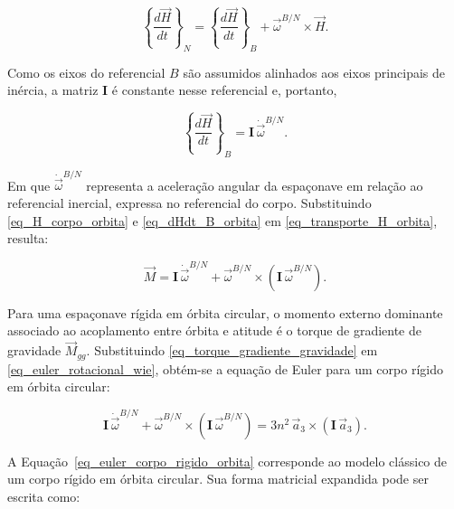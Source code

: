 \begin{equation}
\left\{ \frac{d\vec{H}}{dt} \right\}_{N}
=
\left\{ \frac{d\vec{H}}{dt} \right\}_{B}
+
\vec{\omega}^{B/N}\times\vec{H}.
\label{eq_transporte_H_orbita}
\end{equation}

Como os eixos do referencial $B$ são assumidos alinhados aos eixos principais de inércia, a matriz $\mathbf{I}$ é constante nesse referencial e, portanto,

\begin{equation}
\left\{ \frac{d\vec{H}}{dt} \right\}_{B}
=
\mathbf{I}\,\dot{\vec{\omega}}^{B/N}.
\label{eq_dHdt_B_orbita}
\end{equation}

Em que $\dot{\vec{\omega}}^{B/N}$ representa a aceleração angular da espaçonave em relação ao referencial inercial, expressa no referencial do corpo.
Substituindo \eqref{eq_H_corpo_orbita} e \eqref{eq_dHdt_B_orbita} em \eqref{eq_transporte_H_orbita}, resulta:

\begin{equation}
\vec{M}
=
\mathbf{I}\,\dot{\vec{\omega}}^{B/N}
+
\vec{\omega}^{B/N}\times\left(\mathbf{I}\,\vec{\omega}^{B/N}\right).
\label{eq_euler_rotacional_wie}
\end{equation}


Para uma espaçonave rígida em órbita circular, o momento externo dominante associado ao acoplamento entre órbita e atitude é o torque de gradiente de gravidade $\vec{M}_{gg}$.
Substituindo \eqref{eq_torque_gradiente_gravidade} em \eqref{eq_euler_rotacional_wie}, obtém-se a equação de Euler para um corpo rígido em órbita circular:

\begin{equation}
\mathbf{I}\,\dot{\vec{\omega}}^{B/N}
+
\vec{\omega}^{B/N}\times\left(\mathbf{I}\,\vec{\omega}^{B/N}\right)
=
3n^2\,\vec{a}_3 \times \left(\mathbf{I}\,\vec{a}_3\right).
\label{eq_euler_corpo_rigido_orbita}
\end{equation}


A Equação~\eqref{eq_euler_corpo_rigido_orbita} corresponde ao modelo clássico de um corpo rígido em órbita circular. Sua forma matricial expandida pode ser escrita como:

